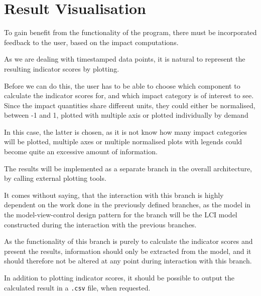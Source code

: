 \section{Result Visualisation} \label{sec:ResultVisualisation} 

To gain benefit from the functionality of the program, there must be incorporated feedback to the user, based on the impact computations.

As we are dealing with timestamped data points, it is natural to represent the resulting indicator scores by plotting.

Before we can do this, the user has to be able to choose which component to calculate the indicator scores for, and which impact category is of interest to see. Since the impact quantities share different units, they could either be normalised, between -1 and 1, plotted with multiple axis or plotted individually by demand

In this case, the latter is chosen, as it is not know how many impact categories will be plotted, multiple axes or multiple normalised plots with legends could become quite an excessive amount of information.

The results will be implemented as a separate branch in the overall architecture, by calling external plotting tools. 

It comes without saying, that the interaction with this branch is highly dependent on the work done in the previously defined branches, as the model in the model-view-control design pattern for the branch will be the LCI model constructed during the interaction with the previous branches.

As the functionality of this branch is purely to calculate the indicator scores and present the results, information should only be extracted from the model, and it should therefore not be altered at any point during interaction with this branch. 

In addition to plotting indicator scores, it should be possible to output the calculated result in a \texttt{.csv} file, when requested.